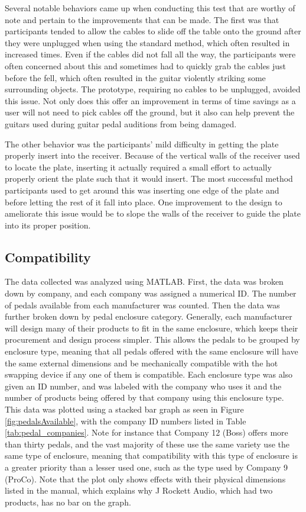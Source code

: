 \documentclass{article}
\begin{document}
	Several notable behaviors came up when conducting this test that are worthy of note and pertain to the improvements that can be made.  The first was that participants tended to allow the cables to slide off the table onto the ground after they were unplugged when using the standard method, which often resulted in increased times.  Even if the cables did not fall all the way, the participants were often concerned about this and sometimes had to quickly grab the cables just before the fell, which often resulted in the guitar violently striking some surrounding objects.  The prototype, requiring no cables to be unplugged, avoided this issue.  Not only does this offer an improvement in terms of time savings as a user will not need to pick cables off the ground, but it also can help prevent the guitars used during guitar pedal auditions from being damaged.

	The other behavior was the participants' mild difficulty in getting the plate properly insert into the receiver.  Because of the vertical walls of the receiver used to locate the plate, inserting it actually required a small effort to actually properly orient the plate such that it would insert.  The most successful method participants used to get around this was inserting one edge of the plate and before letting the rest of it fall into place.  One improvement to the design to ameliorate this issue would be to slope the walls of the receiver to guide the plate into its proper position.

	\color{gray}

	\subsection{Compatibility}
	The data collected was analyzed using MATLAB.  First, the data was broken down by company, and each company was assigned a numerical ID.  The number of pedals available from each manufacturer was counted.  Then the data was further broken down by pedal enclosure category.  Generally, each manufacturer will design many of their products to fit in the same enclosure, which keeps their procurement and design process simpler.  This allows the pedals to be grouped by enclosure type, meaning that all pedals offered with the same enclosure will have the same external dimensions and be mechanically compatible with the hot swapping device if any one of them is compatible.  Each enclosure type was also given an ID number, and was labeled with the company who uses it and the number of products being offered by that company using this enclosure type.  This data was plotted using a stacked bar graph as seen in Figure \ref{fig:pedalsAvailable}, with the company ID numbers listed in Table \ref{tab:pedal_companies}.  Note for instance that Company 12 (Boss) offers more than thirty pedals, and the vast majority of these use the same variety use the same type of enclosure, meaning that compatibility with this type of enclosure is a greater priority than a lesser used one, such as the type used by Company 9 (ProCo).  Note that the plot only shows effects with their physical dimensions listed in the manual, which explains why J Rockett Audio, which had two products, has no bar on the graph.
\end{document}
